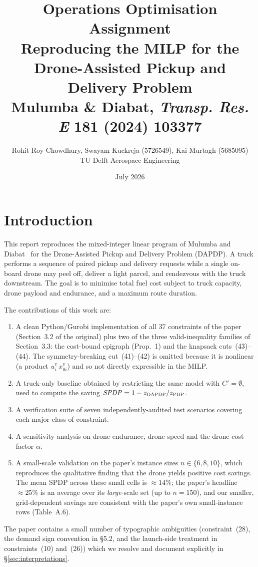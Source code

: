 \documentclass[11pt,a4paper]{article}
\title{Operations Optimisation Assignment\\
\large Reproducing the MILP for the Drone-Assisted Pickup and Delivery Problem\\
{\small Mulumba \& Diabat, \emph{Transp. Res. E} 181 (2024) 103377}}
\author{Rohit Roy Chowdhury, Swayam Kuckreja (5726549), Kai Murtagh (5685095)\\TU Delft Aerospace Engineering}
\date{July 2026}
\newcommand{\Cprime}{C'}
\newcommand{\dapdp}{\textsc{DAPDP}}
\newcommand{\pdp}{\textsc{PDP}}
\begin{document}
\maketitle

\section{Introduction}

This report reproduces the mixed-integer linear program of Mulumba and
Diabat~\cite{mulumba2024} for the Drone-Assisted Pickup and Delivery Problem
(\dapdp). A truck performs a sequence of paired pickup and delivery requests
while a single on-board drone may peel off, deliver a light parcel, and
rendezvous with the truck downstream. The goal is to minimise total fuel cost
subject to truck capacity, drone payload and endurance, and a maximum route
duration.

The contributions of this work are:
\begin{enumerate}
\item A clean Python/Gurobi implementation of all $37$ constraints of the
paper (Section~3.2 of the original) plus two of the three valid-inequality
families of Section~3.3: the cost-bound epigraph (Prop.~1) and the knapsack
cuts~(43)--(44). The symmetry-breaking cut~(41)--(42) is omitted because it
is nonlinear (a product $u^{v}_{i}\,x^{v}_{0i}$) and so not directly
expressible in the MILP.
\item A truck-only baseline obtained by restricting the same model with
$\Cprime{=}\emptyset$, used to compute the saving $\mathit{SPDP} = 1 -
z_{\dapdp} / z_{\pdp}$.
\item A verification suite of seven independently-audited test scenarios
covering each major class of constraint.
\item A sensitivity analysis on drone endurance, drone speed and the drone
cost factor $\alpha$.
\item A small-scale validation on the paper's instance sizes
$n \in \{6, 8, 10\}$, which reproduces the qualitative finding that the drone
yields positive cost savings. The mean SPDP across these small cells is
$\approx 14\%$; the paper's headline $\approx 25\%$ is an average over its
\emph{large}-scale set (up to $n{=}150$), and our smaller, grid-dependent
savings are consistent with the paper's own small-instance rows
(Table~A.6).
\end{enumerate}

The paper contains a small number of typographic ambiguities
(constraint~(28), the demand sign convention in \S5.2, and the launch-side
treatment in constraints~(10) and~(26)) which we resolve and document
explicitly in \S\ref{sec:interpretations}.
\end{document}
